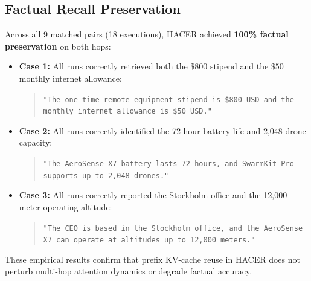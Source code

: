 \subsection{Factual Recall Preservation}
Across all 9 matched pairs (18 executions), HACER achieved \textbf{100\% factual preservation} on both hops:
\begin{itemize}
    \item \textbf{Case 1:} All runs correctly retrieved both the $\$800$ stipend and the $\$50$ monthly internet allowance:
    \begin{quote}
    \small
    \texttt{"The one-time remote equipment stipend is \$800 USD and the monthly internet allowance is \$50 USD."}
    \end{quote}
    \item \textbf{Case 2:} All runs correctly identified the 72-hour battery life and 2,048-drone capacity:
    \begin{quote}
    \small
    \texttt{"The AeroSense X7 battery lasts 72 hours, and SwarmKit Pro supports up to 2,048 drones."}
    \end{quote}
    \item \textbf{Case 3:} All runs correctly reported the Stockholm office and the 12,000-meter operating altitude:
    \begin{quote}
    \small
    \texttt{"The CEO is based in the Stockholm office, and the AeroSense X7 can operate at altitudes up to 12,000 meters."}
    \end{quote}
\end{itemize}
These empirical results confirm that prefix KV-cache reuse in HACER does not perturb multi-hop attention dynamics or degrade factual accuracy.
